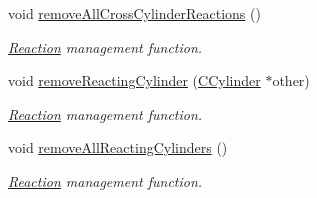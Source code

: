 \begin{DoxyCompactItemize}
void \hyperlink{classCCylinder_a7767880083ceda061babd4225557d7c3}{remove\+All\+Cross\+Cylinder\+Reactions} ()
\begin{DoxyCompactList}\small\item\em \hyperlink{classReaction}{Reaction} management function. \end{DoxyCompactList}\item 
void \hyperlink{classCCylinder_a3aecfb4bb31a032ccb73200f71f40ed9}{remove\+Reacting\+Cylinder} (\hyperlink{classCCylinder}{C\+Cylinder} $\ast$other)
\begin{DoxyCompactList}\small\item\em \hyperlink{classReaction}{Reaction} management function. \end{DoxyCompactList}\item 
void \hyperlink{classCCylinder_a97f1758093c7275bdb17ac92b6a05117}{remove\+All\+Reacting\+Cylinders} ()
\begin{DoxyCompactList}\small\item\em \hyperlink{classReaction}{Reaction} management function. \end{DoxyCompactList}\end{DoxyCompactItemize}

